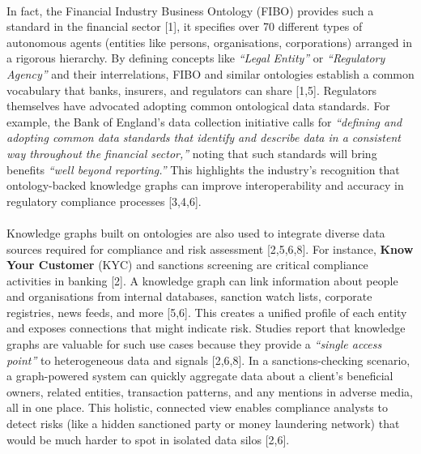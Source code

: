         \paragraph{} In fact, the Financial Industry Business Ontology (FIBO) provides such a standard in the financial sector [1], it specifies over 70 different types of autonomous agents (entities like persons, organisations, corporations) arranged in a rigorous hierarchy. By defining concepts like \textit{“Legal Entity”} or \textit{“Regulatory Agency”} and their interrelations, FIBO and similar ontologies establish a common vocabulary that banks, insurers, and regulators can share [1,5]. Regulators themselves have advocated adopting common ontological data standards. For example, the Bank of England’s data collection initiative calls for \textit{“defining and adopting common data standards that identify and describe data in a consistent way throughout the financial sector,”} noting that such standards will bring benefits \textit{“well beyond reporting.”} This highlights the industry’s recognition that ontology-backed knowledge graphs can improve interoperability and accuracy in regulatory compliance processes [3,4,6].

        \paragraph{} Knowledge graphs built on ontologies are also used to integrate diverse data sources required for compliance and risk assessment [2,5,6,8]. For instance, \textbf{Know Your Customer} (KYC) and sanctions screening are critical compliance activities in banking [2]. A knowledge graph can link information about people and organisations from internal databases, sanction watch lists, corporate registries, news feeds, and more [5,6]. This creates a unified profile of each entity and exposes connections that might indicate risk. Studies report that knowledge graphs are valuable for such use cases because they provide a \textit{“single access point”} to heterogeneous data and signals [2,6,8]. In a sanctions-checking scenario, a graph-powered system can quickly aggregate data about a client’s beneficial owners, related entities, transaction patterns, and any mentions in adverse media, all in one place. This holistic, connected view enables compliance analysts to detect risks (like a hidden sanctioned party or money laundering network) that would be much harder to spot in isolated data silos [2,6].

